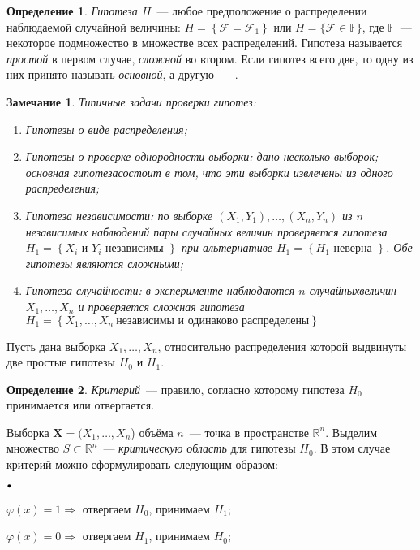 \documentclass[oneside,final,14pt]{extreport}
\newtheorem*{rmrk}{Замечание}
\theoremstyle{definition}
\newtheorem{defn}{Определение}[section]
\newcommand\sbullet[1][.5]{\mathbin{\vcenter{\hbox{\scalebox{#1}{$\bullet$}}}}}
\newenvironment{compactlist}{
\begin{list}{{$\sbullet[.75]$}}{
\setlength\partopsep{0pt}
\setlength\parskip{0pt}
\setlength\parsep{0pt}
\setlength\topsep{0pt}
\setlength\itemsep{0pt}
}
}{
\end{list}
}
\begin{document}
\begin{defn}
{\it Гипотеза $H$}~--- любое предположение о распределении наблюдаемой случайной величины: $H=\left\{\mathcal{F}=\mathcal{F}_{1}\right\}$ или $H=\{\mathcal{F} \in \mathbb{F}\}$, где $\mathbb{F}$~--- некоторое подмножество в множестве всех распределений. Гипотеза называется {\it простой} в первом случае, {\it сложной} во втором. Если гипотез всего две, то одну из них принято называть {\it основной}, а другую~--- {}.
\end{defn}

\begin{rmrk} Типичные задачи проверки гипотез:
\begin{enumerate}
    \item Гипотезы о виде распределения;
    \item Гипотезы о проверке однородности выборки: дано несколько выборок; основная гипотезасостоит в том, что эти выборки извлечены из одного распределения;
    \item Гипотеза независимости: по выборке $(X_1,Y_1), \ldots, (X_n,Y_n)$ из $n$ независимых наблюдений пары случайных величин проверяется гипотеза $H_{1}=\left\{X_{i} \text { и } Y_{i} \text { независимы }\right\}$ при альтернативе $H_{1}=\left\{H_{1} \text { неверна }\right\}$. Обе гипотезы являются сложными;
    \item Гипотеза случайности: в эксперименте наблюдаются $n$ случайныхвеличин $X_{1}, \ldots, X_{n}$ и проверяется сложная гипотеза $H_{1}=\left\{X_{1}, \ldots, X_{n}~ \text{независимы и одинаково распределены}\right\}$
\end{enumerate}
\end{rmrk}

Пусть дана выборка $X_{1}, \ldots, X_{n}$, относительно распределения которой выдвинуты две простые гипотезы $H_{0}$ и $H_1$.
\begin{defn}
{\it Критерий}~--- правило, согласно которому гипотеза $H_0$ принимается или отвергается.
\end{defn}
Выборка $\mathbf{X} = (X_1, \ldots, X_n$) объёма $n$~--- точка в пространстве $\mathbb{R}^{n}$. Выделим множество $S \subset \mathbb{R}^{n}$~--- {\it критическую область} для гипотезы $H_0$. В этом случае критерий можно сформулировать следующим образом:
\begin{compactlist}
    \item $\varphi(x) = 1 \Rightarrow$ отвергаем $H_0$, принимаем $H_1$;
    \item $\varphi(x) = 0 \Rightarrow$ отвергаем $H_1$, принимаем $H_0$;
\end{compactlist}
\end{document}
